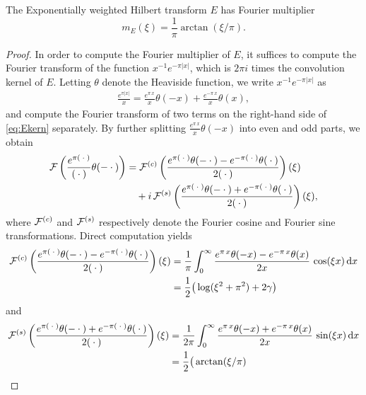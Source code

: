 \documentclass[../dissertation.tex]{subfiles}
\begin{document}
\begin{lma}\label{lma:FMultE}
	The Exponentially weighted Hilbert transform $E$ has Fourier multiplier
	$$m_E(\xi) = \frac{1}{\pi} \arctan(\xi/\pi).$$
\end{lma}
\begin{proof}
	In order to compute the Fourier multiplier of $E$, it suffices to compute the Fourier
	transform of the function $x^{-1} e^{-\pi|x|}$, which is $2\pi i$ times the 
	convolution kernel of $E$. Letting $\theta$ denote the Heaviside function, we 
	write $x^{-1} e^{-\pi|x|}$ as 
	\begin{align}\label{eq:Ekern}
		\frac{e^{\pi |x|}}{x} 
			=
			\frac{e^{\pi \, x}}{x} \theta(-x) + \frac{e^{-\pi \, x}}{x} \theta(x),
	\end{align}
	and compute the Fourier transform of two terms on the right-hand side of 
	\eqref{eq:Ekern} separately. By further splitting $\frac{e^{\pi \, x}}{x} \theta(-x)$
	into even and odd parts, we obtain
	\begin{align}
		\mathcal F\left( \frac{e^{\pi (\kern 0.5ex \cdot \kern 0.5ex)}}{(\kern 0.5ex \cdot \kern 0.5ex)} \theta(-\kern 0.5ex \cdot \kern 0.5ex) \right)
			&= \mathcal F^{(c)} \left( 
					\frac{e^{\pi (\kern 0.5ex \cdot \kern 0.5ex)}\theta(-\kern 0.5ex \cdot \kern 0.5ex)-e^{-\pi(\kern 0.5ex \cdot \kern 0.5ex)}\theta(\kern 0.5ex \cdot \kern 0.5ex)}
						{2(\kern 0.5ex \cdot \kern 0.5ex)}  
				\right)(\xi)
				\\
			&\quad + i \, \mathcal F^{(s)} \left(
					\frac{e^{\pi(\kern 0.5ex \cdot \kern 0.5ex)}\theta(-\kern 0.5ex \cdot \kern 0.5ex)+e^{-\pi(\kern 0.5ex \cdot \kern 0.5ex)}\theta(\kern 0.5ex \cdot \kern 0.5ex)}
						{2(\kern 0.5ex \cdot \kern 0.5ex)} 
				\right)(\xi),
				\nonumber
	\end{align}
	where $\mathcal F^{(c)}$ and $\mathcal F^{(s)}$ respectively denote the Fourier cosine and
	Fourier sine transformations. Direct computation yields 
	\begin{align*}
		\mathcal F^{(c)} \left( 
			\frac{e^{\pi (\kern 0.5ex \cdot \kern 0.5ex)}\theta(-\kern 0.5ex \cdot \kern 0.5ex)-e^{-\pi(\kern 0.5ex \cdot \kern 0.5ex)}\theta(\kern 0.5ex \cdot \kern 0.5ex)}
				{2(\kern 0.5ex \cdot \kern 0.5ex)}  
		\right)(\xi)
			&= \frac{1}{\pi}
				\int_0^\infty 
					\frac{e^{\pi \,x}\theta(-x)-e^{-\pi\,x}\theta(x)}{2x}
				\, \cos(\xi x) \, \mathrm{d}x 
				\\
			&= \frac{1}{2} \big(
					\log(\xi^2 + \pi^2) + 2 \gamma
				\big)
				\nonumber
	\end{align*}
	and 
	\begin{align*}
		\mc F^{(s)} \left( 
			\frac{e^{\pi (\dotarg)}\theta(-\dotarg)+e^{-\pi(\dotarg)}\theta(\dotarg)}
				{2(\dotarg)}  
		\right)(\xi)
			&= \frac{1}{2\pi} 
				\int_0^\infty 
					\frac{e^{\pi \,x}\theta(-x)+e^{-\pi\,x}\theta(x)}{2x}
				\, \sin(\xi x) \, \mathrm{d}x 
				\\
			&= \frac{1}{2} \big(
					\arctan(\xi/\pi)

\end{align*}
\end{proof}
\end{document}
